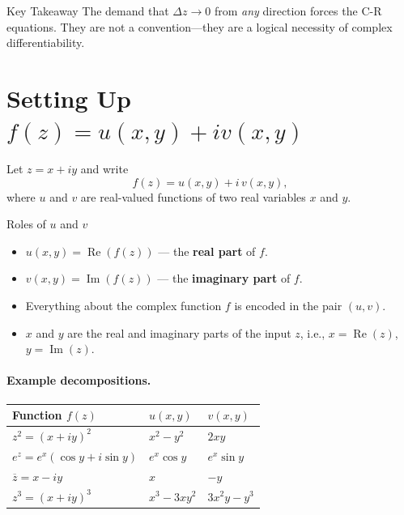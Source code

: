 \documentclass[12pt,a4paper]{article}
\begin{document}
\begin{learnbox}{Key Takeaway}
The demand that $\Delta z \to 0$ from \emph{any} direction forces the C-R equations. They are not a convention---they are a logical necessity of complex differentiability.
\end{learnbox}

\section{Setting Up $f(z)=u(x,y)+iv(x,y)$}

Let $z = x + iy$ and write
\[
  f(z) = u(x,y) + i\,v(x,y),
\]
where $u$ and $v$ are real-valued functions of two real variables $x$ and $y$.

\begin{infobox}{Roles of $u$ and $v$}
\begin{itemize}[noitemsep]
  \item $u(x,y) = \operatorname{Re}(f(z))$ --- the \textbf{real part} of $f$.
  \item $v(x,y) = \operatorname{Im}(f(z))$ --- the \textbf{imaginary part} of $f$.
  \item Everything about the complex function $f$ is encoded in the pair $(u,v)$.
  \item $x$ and $y$ are the real and imaginary parts of the input $z$, i.e., $x = \operatorname{Re}(z)$, $y = \operatorname{Im}(z)$.
\end{itemize}
\end{infobox}

\paragraph{Example decompositions.}
\begin{center}
\begin{tabular}{lll}
\toprule
\textbf{Function} $f(z)$ & $u(x,y)$ & $v(x,y)$ \\
\midrule
$z^2 = (x+iy)^2$ & $x^2 - y^2$ & $2xy$ \\
$e^z = e^x(\cos y + i\sin y)$ & $e^x\cos y$ & $e^x\sin y$ \\
$\overline{z} = x - iy$ & $x$ & $-y$ \\
$z^3 = (x+iy)^3$ & $x^3 - 3xy^2$ & $3x^2y - y^3$ \\
\bottomrule
\end{tabular}
\end{center}
\end{document}
